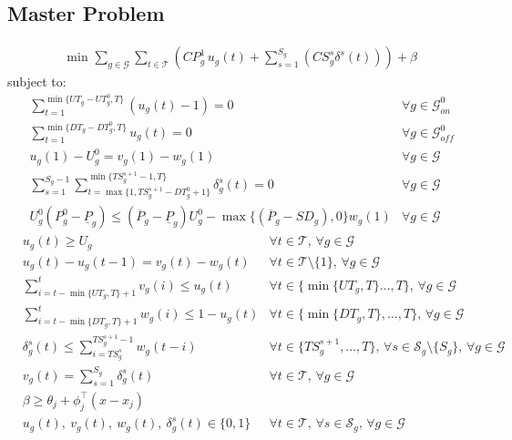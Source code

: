\documentclass[a4paper,12pt]{article}
\newcommand{\cG}{\mathcal{G}}
\newcommand{\cT}{\mathcal{T}}
\newcommand{\cS}{\mathcal{S}}
\newcommand{\uPP}{\underline{P}}
\newcommand{\oPP}{\overline{P}}
\begin{document}
\subsection*{Master Problem}
{\allowdisplaybreaks
\begin{align}
    & \text{min } \sum_{g \in \cG} \sum_{t \in \cT} \left( CP_g^1 \, u_g(t) + \sum_{s = 1}^{S_g} \left( CS^s_g \delta^s(t) \right) \right) + \beta \label{eq:master_obj}
\end{align}
subject to:
\begin{align}
    & \sum_{t=1}^{\min\{UT_g - UT_g^0, T\}} (u_g(t) - 1) = 0 & \forall g \in \cG_{\textit{on}}^0 \label{eq:initialUpRequirement} \\
    & \sum_{t=1}^{\min\{DT_g - DT_g^0, T\}} u_g(t) = 0 & \forall g \in \cG_{\textit{off}}^0 \label{eq:initialDownRequirement} \\
    & u_g(1) - U_g^0 = v_g(1) - w_g(1) & \forall g \in \cG \label{eq:LogicalInitial} \\	
    & \sum_{s=1}^{S_g-1} \sum_{t=\max\{1, TS^{s+1}_g - DT^0_g + 1\}}^{\min\{TS^{s+1}_g -1,T\}} \delta^s_g(t) = 0 & \forall g \in \cG \label{eq:STIInit} \\
    & U_g^0(P_g^0-\uPP_g) \leq (\oPP_g - \uPP_g) U_g^0 - \max\{(\oPP_g - SD_g),0\} w_g(1) & \forall g \in \cG \label{eq:MaxOutput2Init}
\end{align}
\begin{align}
    & u_g(t) \geq U_g & \forall t \in \cT, \, \forall g \in \cG \label{eq:MustRun} \\
    & u_g(t) - u_g(t-1) = v_g(t) - w_g(t) & \forall t \in \cT\setminus\{1\}, \, \forall g \in \cG \label{eq:Logical} \\
    & \sum_{i= t-\min\{UT_g,T\} + 1}^t v_g(i) \leq u_g(t) & \forall t \in \{\min\{UT_g,T\} \ldots, T\}, \, \forall g \in \cG \label{eq:Startup} \\
    & \sum_{i= t-\min\{DT_g,T\} + 1}^t w_g(i) \leq 1 - u_g(t) & \forall t \in \{\min\{DT_g, T\}, \ldots, T\}, \, \forall g \in \cG \label{eq:Shutdown} \\
    & \delta^s_g(t) \leq \sum_{i = TS^s_g}^{TS^{s+1}_g-1} w_g(t-i) & \forall t \in \{TS^{s+1}_g,\ldots,T\},\,\forall s \in \cS_g\!\setminus\!\{S_g\},\,  \forall g \in \cG \label{eq:STISelect} \\
    & v_g(t) = \sum_{s = 1}^{S_g} \delta^s_g(t) & \forall t \in \cT,\, \forall g \in \cG \label{eq:STILink} \\
    & \beta \geq \theta_j + \phi_j^\top (x - x_j) & \label{eq:BendersCuts} \\
    & u_g(t),\ v_g(t),\ w_g(t),\ \delta^s_g(t) \in \{0,1\} & \forall t \in \cT,\, \forall s \in \cS_g,\, \forall g \in \cG \label{eq:VariableDomains}
\end{align}
}
\end{document}
